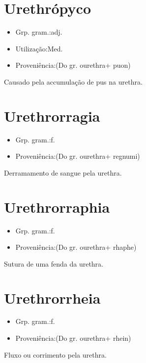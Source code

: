 \documentclass{article}
\begin{document}
\section{Urethrópyco}
\begin{itemize}
\item {Grp. gram.:adj.}
\end{itemize}
\begin{itemize}
\item {Utilização:Med.}
\end{itemize}
\begin{itemize}
\item {Proveniência:(Do gr. \textunderscore ourethra\textunderscore  + \textunderscore puon\textunderscore )}
\end{itemize}
Causado pela accumulação de pus na urethra.
\section{Urethrorragia}
\begin{itemize}
\item {Grp. gram.:f.}
\end{itemize}
\begin{itemize}
\item {Proveniência:(Do gr. \textunderscore ourethra\textunderscore  + \textunderscore regnumi\textunderscore )}
\end{itemize}
Derramamento de sangue pela urethra.
\section{Urethrorraphia}
\begin{itemize}
\item {Grp. gram.:f.}
\end{itemize}
\begin{itemize}
\item {Proveniência:(Do gr. \textunderscore ourethra\textunderscore  + \textunderscore rhaphe\textunderscore )}
\end{itemize}
Sutura de uma fenda da urethra.
\section{Urethrorrheia}
\begin{itemize}
\item {Grp. gram.:f.}
\end{itemize}
\begin{itemize}
\item {Proveniência:(Do gr. \textunderscore ourethra\textunderscore  + \textunderscore rhein\textunderscore )}
\end{itemize}
Fluxo ou corrimento pela urethra.
\end{document}
